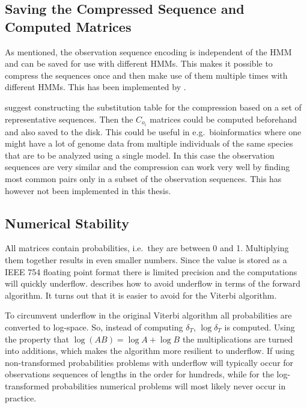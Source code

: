 \subsection{Saving the Compressed Sequence and Computed Matrices}
\label{sec:saving-compr-sequ}

As mentioned, the observation sequence encoding is independent of the HMM and
can be saved for use with different HMMs. This makes it possible to compress
the sequences once and then make use of them multiple times
with different HMMs. This has been implemented by \citet{sand2013ziphmmlib}.

\citet{lifshits2009speeding} suggest constructing the substitution table
for the compression based on a set of representative sequences. Then the
$C_{o_i}$ matrices could be computed beforehand and also saved to the disk.
This could be useful in e.g.\ bioinformatics where one might have a lot of
genome data from multiple individuals of the same species that are to be
analyzed using a single model. In this case the observation sequences are very
similar and the compression can work very well by finding most common pairs
only in a subset of the observation sequences. This has however not been
implemented in this thesis.

\subsection{Numerical Stability}

All matrices contain probabilities, i.e.\ they are between 0 and 1. Multiplying
them together results in even smaller numbers. Since the value is stored as a
IEEE 754 floating point format there is limited precision and the computations
will quickly underflow. \citet{sand2013ziphmmlib} describes how to avoid
underflow in terms of the forward algorithm. It turns out that it is easier to
avoid for the Viterbi algorithm.

To circumvent underflow in the original Viterbi algorithm all probabilities
are converted to log-space. So, instead of computing $\delta_T$,
$\log \delta_T$ is computed. Using the property that
$\log(AB) = \log A + \log B$ the multiplications are turned into additions,
which makes the algorithm more resilient to underflow. If using non-transformed
probabilities problems with underflow will typically occur for observations
sequences of lengths in the order for hundreds, while for the log-transformed
probabilities numerical problems will most likely never occur in practice.

